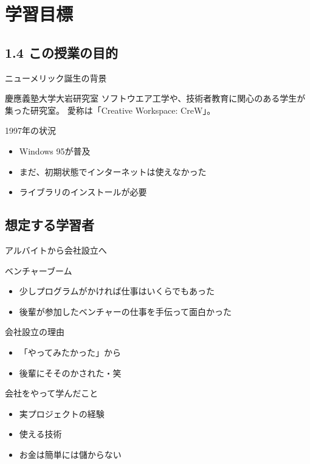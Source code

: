 \documentclass{beamer}
\begin{document}
\section{学習目標}

\subsection{1.4 この授業の目的}

\label{sec-2}
\begin{frame}[label=sec-2-1]{ニューメリック誕生の背景}
\begin{block}{慶應義塾大学大岩研究室}
ソフトウエア工学や、技術者教育に関心のある学生が集った研究室。
愛称は「Creative Workspace: CreW」。
\end{block}
\begin{block}{1997年の状況}
\begin{itemize}
\item Windows 95が普及
\item まだ、初期状態でインターネットは使えなかった
\item ライブラリのインストールが必要
\end{itemize}
\end{block}
\end{frame}

\subsection{想定する学習者}

\begin{frame}[label=sec-2-2]{アルバイトから会社設立へ}
\begin{block}{ベンチャーブーム}
\begin{itemize}
\item 少しプログラムがかければ仕事はいくらでもあった
\item 後輩が参加したベンチャーの仕事を手伝って面白かった
\end{itemize}
\end{block}
\begin{block}{会社設立の理由}
\begin{itemize}
\item 「やってみたかった」から
\item 後輩にそそのかされた・笑
\end{itemize}
\end{block}
\begin{block}{会社をやって学んだこと}
\begin{itemize}
\item 実プロジェクトの経験
\item 使える技術
\item お金は簡単には儲からない
\end{itemize}
\end{block}
\end{frame}
\end{document}

